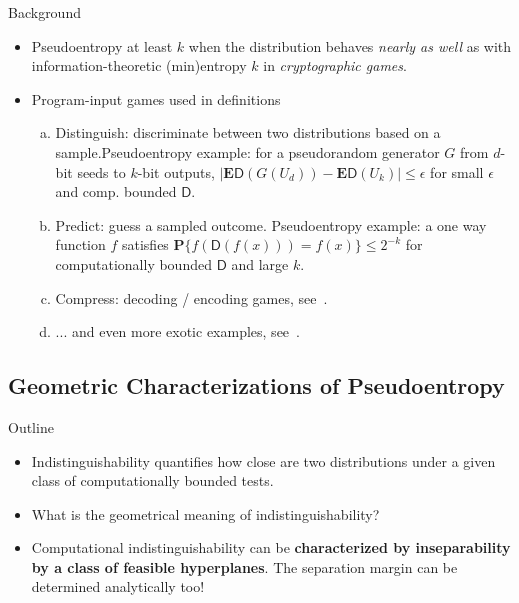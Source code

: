 \documentclass[9pt]{beamer}					%
\begin{document}
\begin{frame}{Background}
\newcommand{\D}{\mathsf{D}}
\begin{itemize}[]
\item Pseudoentropy at least $k$ when the distribution behaves \emph{nearly as well} as with information-theoretic (min)entropy $k$ in \emph{cryptographic games}.
\item Program-input games used in definitions
\begin{enumerate}[(a)]
\item Distinguish: discriminate between two distributions based on a sample.\newline  Pseudoentropy example: for a pseudorandom generator $G$ from $d$-bit seeds to $k$-bit outputs, $|\mathbf{E}\D(G(U_d))-\mathbf{E}\D(U_k)|\leqslant \epsilon$ for small $\epsilon$ and comp. bounded $\D$.
\item Predict: guess a sampled outcome. \newline
Pseudoentropy example: a one way function $f$ satisfies $\mathbf{P}\{ f(\D(f(x)))=f(x) \}\leqslant 2^{-k}$ for computationally bounded $\D$ and large $k$.
\item Compress: decoding / encoding games, see~\cite{yao1982theory, DBLP:conf/random/BarakSW03}.
\item ... and even more exotic examples, see~\cite{haitner2009inaccessible}.
\end{enumerate}
\end{itemize}
\end{frame}

\subsection{Geometric Characterizations of Pseudoentropy }

\begin{frame}{Outline}
\begin{itemize}
\item[\emoji{open-book}] Indistinguishability quantifies how close are two distributions under a given class of computationally bounded tests. 
\item[\emoji{question}] What is the geometrical meaning of indistinguishability?
\item[\emoji{raised-hand}] Computational indistinguishability can be \textbf{characterized by inseparability by a class of feasible hyperplanes}. The separation margin can be determined analytically too! 
\end{itemize}
\end{frame}
\end{document}

